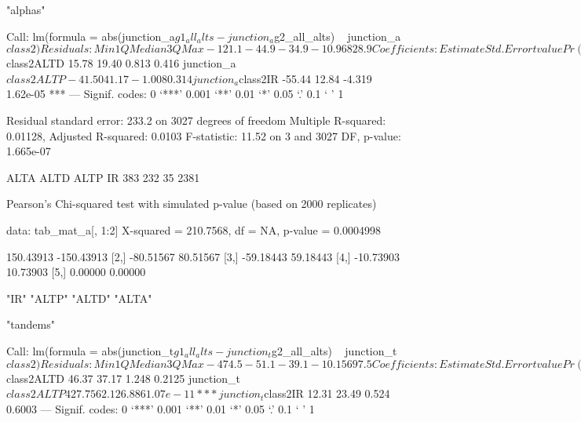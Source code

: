 \documentclass{article}
\begin{document}
\begin{Schunk}
\begin{Soutput}
[1] "alphas"
\end{Soutput}
\begin{Soutput}
Call:
lm(formula = abs(junction_a$g1_all_alts - junction_a$g2_all_alts) ~ 
    junction_a$class2)

Residuals:
   Min     1Q Median     3Q    Max 
-121.1  -44.9  -34.9  -10.9 6828.9 

Coefficients:
                      Estimate Std. Error t value Pr(>|t|)    
(Intercept)             105.30      11.91   8.838  < 2e-16 ***
junction_a$class2ALTD    15.78      19.40   0.813    0.416    
junction_a$class2ALTP   -41.50      41.17  -1.008    0.314    
junction_a$class2IR     -55.44      12.84  -4.319 1.62e-05 ***
---
Signif. codes:  0 ‘***’ 0.001 ‘**’ 0.01 ‘*’ 0.05 ‘.’ 0.1 ‘ ’ 1

Residual standard error: 233.2 on 3027 degrees of freedom
Multiple R-squared:  0.01128,	Adjusted R-squared:  0.0103 
F-statistic: 11.52 on 3 and 3027 DF,  p-value: 1.665e-07
\end{Soutput}
\begin{Soutput}
ALTA ALTD ALTP   IR 
 383  232   35 2381 
\end{Soutput}
\begin{Soutput}
	Pearson's Chi-squared test with simulated p-value (based on 2000
	replicates)

data:  tab_mat_a[, 1:2]
X-squared = 210.7568, df = NA, p-value = 0.0004998
\end{Soutput}
\begin{Soutput}
          [,1]       [,2]
[1,] 150.43913 -150.43913
[2,] -80.51567   80.51567
[3,] -59.18443   59.18443
[4,] -10.73903   10.73903
[5,]   0.00000    0.00000
\end{Soutput}
\begin{Soutput}
[1] "IR"   "ALTP" "ALTD" "ALTA"
\end{Soutput}
\begin{Soutput}
[1] "tandems"
\end{Soutput}
\begin{Soutput}
Call:
lm(formula = abs(junction_t$g1_all_alts - junction_t$g2_all_alts) ~ 
    junction_t$class2)

Residuals:
   Min     1Q Median     3Q    Max 
-474.5  -51.1  -39.1  -10.1 5697.5 

Coefficients:
                      Estimate Std. Error t value Pr(>|t|)    
(Intercept)              46.77      21.41   2.185   0.0291 *  
junction_t$class2ALTD    46.37      37.17   1.248   0.2125    
junction_t$class2ALTP   427.75      62.12   6.886 1.07e-11 ***
junction_t$class2IR      12.31      23.49   0.524   0.6003    
---
Signif. codes:  0 ‘***’ 0.001 ‘**’ 0.01 ‘*’ 0.05 ‘.’ 0.1 ‘ ’ 1


\end{Soutput}
\end{Schunk}
\end{document}
